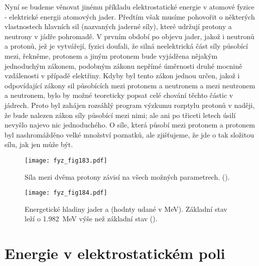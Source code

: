     Nyní se budeme věnovat jinému příkladu elektrostatické energie v atomové fyzice - elektrické
    energii atomových jader. Předtím však musíme pohovořit o některých vlastnostech hlavních sil
    (nazvaných jaderné síly), které udržují protony a neutrony v jádře pohromadě. V prvním období po
    objevu jader, jakož i neutronů a protonů, jež je vytvářejí, fyzici doufali, že silná
    neelektrická část síly působící mezi, řekněme, protonem a jiným protonem bude vyjádřena nějakým
    jednoduchým zákonem, podobným zákonu nepřímé úměrnosti druhé mocnině vzdálenosti v případě
    elektřiny. Kdyby byl tento zákon jednou určen, jakož i odpovídající zákony sil působících mezi
    protonem a neutronem a mezi neutronem a neutronem, bylo by možné teoreticky popsat celé chování
    těchto částic v jádrech. Proto byl zahájen rozsáhlý program výzkumu rozptylu protonů v naději,
    že bude nalezen zákon síly působící mezi nimi; ale ani po třiceti letech úsilí nevyšlo najevo
    nic jednoduchého. O síle, která působí mezi protonem a protonem byl nashromážděno velké množství
    poznatků, ale zjišťujeme, že jde o tak složitou sílu, jak jen může být.

    \begin{figure}[ht!]  %
      \centering
      \texttt{[image: fyz\_fig183.pdf]}
      \caption{Síla mezi dvěma protony závisí na všech možných parametrech.
              (\cite[s.~148]{Feynman02}).}
      \label{fyz:fig183}
    \end{figure}

    \begin{figure}[ht!]  %
      \centering
      \texttt{[image: fyz\_fig184.pdf]}
      \caption{Energetické hladiny jader  a  (hodnty udané v
              \si{\mega\electronvolt}). Základní stav  leží o
              \SI{1.982}{\mega\electronvolt} výše než základní stav 
              (\cite[s.~149]{Feynman02}).}
      \label{fyz:fig184}
    \end{figure}
    
  \section{Energie v elektrostatickém poli}\label{fyz:IIchapVIsecV}

